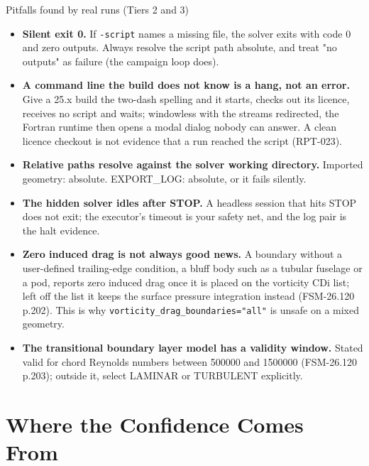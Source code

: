 \documentclass[aspectratio=169,10pt]{beamer}
\newcommand{\code}[1]{\texttt{\small #1}}
\begin{document}
\begin{frame}[shrink=4]{Pitfalls found by real runs (Tiers 2 and 3)}
  \begin{itemize}
    \item \textbf{Silent exit 0.} If \code{-script} names a missing file, the solver exits with code 0 and zero outputs. Always resolve the script path absolute, and treat "no outputs" as failure (the campaign loop does).
    \item \textbf{A command line the build does not know is a hang, not an error.} Give a 25.x build the two-dash spelling and it starts, checks out its licence, receives no script and waits; windowless with the streams redirected, the Fortran runtime then opens a modal dialog nobody can answer. A clean licence checkout is not evidence that a run reached the script (RPT-023).
    \item \textbf{Relative paths resolve against the solver working directory.} Imported geometry: absolute. EXPORT\_LOG: absolute, or it fails silently.
    \item \textbf{The hidden solver idles after STOP.} A headless session that hits STOP does not exit; the executor's timeout is your safety net, and the log pair is the halt evidence.
    \item \textbf{Zero induced drag is not always good news.} A boundary without a user-defined trailing-edge condition, a bluff body such as a tubular fuselage or a pod, reports zero induced drag once it is placed on the vorticity CDi list; left off the list it keeps the surface pressure integration instead (FSM-26.120 p.202). This is why \code{vorticity\_drag\_boundaries="all"} is unsafe on a mixed geometry.
    \item \textbf{The transitional boundary layer model has a validity window.} Stated valid for chord Reynolds numbers between 500000 and 1500000 (FSM-26.120 p.203); outside it, select LAMINAR or TURBULENT explicitly.
  \end{itemize}
\end{frame}

\section{Where the Confidence Comes From}
\end{document}
